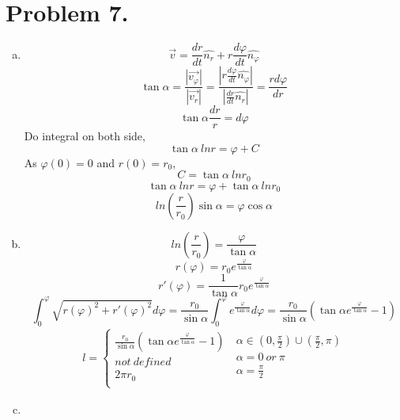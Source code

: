 \documentclass{article}
\begin{document}
\section*{Problem 7.}
	\begin{enumerate}[(a)]
	\item
		$$\vec{v}=\frac{dr}{dt}\hat{n_r}+r\frac{d\varphi}{dt}\hat{n_\varphi}$$
		$$\tan\alpha=\frac{|\vec{v_\varphi}|}{|\vec{v_r}|}
		=\frac{\left|r\frac{d\varphi}{dt}\hat{n_\varphi}\right|}{\left|\frac{dr}{dt}\hat{n_r}\right|}
		=\frac{rd\varphi}{dr}$$
		$$\tan\alpha\frac{dr}{r}=d\varphi$$
		Do integral on both side,
		$$\tan\alpha\ lnr=\varphi+C$$
		As $\varphi(0)=0$ and $r(0)=r_0$,
		$$C=\tan\alpha\ lnr_0$$
		$$\tan\alpha\ lnr=\varphi+\tan\alpha\ lnr_0$$
		$$ln\left(\frac{r}{r_0}\right)\sin\alpha=\varphi\cos\alpha$$
	\item
		$$ln\left(\frac{r}{r_0}\right)=\frac{\varphi}{\tan\alpha}$$
		$$r(\varphi)=r_0e^{\frac{\varphi}{\tan\alpha}}$$
		$$r'(\varphi)=\frac{1}{\tan\alpha}r_0e^{\frac{\varphi}{\tan\alpha}}$$
		$$\int_0^{\varphi}\sqrt{r(\varphi)^2+r'(\varphi)^2}d\varphi
		=\frac{r_0}{\sin\alpha}\int_0^{\varphi}e^{\frac{\varphi}{\tan\alpha}}d\varphi
		=\frac{r_0}{\sin\alpha}\left(\tan\alpha e^{\frac{\varphi}{\tan\alpha}}-1\right)$$
		\begin{eqnarray*}
			l=\left\{
			\begin{array}{lll}
				\frac{r_0}{\sin\alpha}\left(\tan\alpha e^{\frac{\varphi}{\tan\alpha}}-1\right)\\
				not\ defined\\
				2\pi r_0\\
			\end{array}
			\right.\ \left.
			\begin{array}{lll}
				\alpha\in(0,\frac{\pi}{2})\cup(\frac{\pi}{2},\pi)\\
				\alpha=0\ or\ \pi\\
				\alpha=\frac{\pi}{2}\\
			\end{array}
			\right.
		\end{eqnarray*}
	\newpage	
	\item


\end{enumerate}
\end{document}
